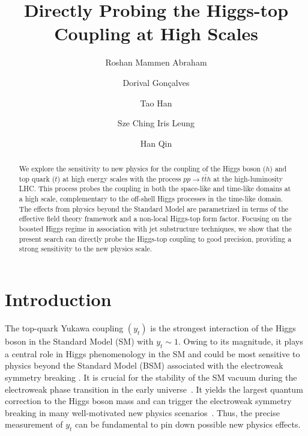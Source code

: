 \documentclass[reprint, aps,prd, preprintnumbers,groupedaddress,nofootinbib]{revtex4-1}
\begin{document}
\title{Directly Probing the Higgs-top Coupling at High Scales}

\author{Roshan Mammen Abraham}
\author{Dorival Gon\c{c}alves}
\author{Tao Han} 
\author{Sze Ching Iris Leung} 
\author{Han Qin} 



\begin{abstract}

We explore the sensitivity to new  physics for the coupling of the Higgs boson ($h$) and top quark ($t$) at high energy scales with the process $pp\to t\bar{t}h$ at the high-luminosity LHC. This process probes the coupling in both the space-like and time-like domains at a high scale, complementary to the off-shell Higgs processes in the time-like domain. The effects from  physics beyond the Standard Model are parametrized in terms of the effective field theory framework and a non-local Higgs-top form factor. Focusing on the boosted Higgs regime in association with jet substructure techniques, we show that the present search can directly probe the Higgs-top coupling to good  precision, providing a strong sensitivity to the new physics scale. 

\end{abstract}
\maketitle

\section{Introduction}
\label{sec:intro}

The top-quark Yukawa coupling $(y_t)$ is the strongest interaction of the Higgs boson in the Standard Model (SM) with $y_t \sim 1$. Owing to its magnitude, it plays a central role in Higgs phenomenology in the SM and could be most sensitive to physics beyond the Standard Model (BSM) associated with the electroweak symmetry breaking \cite{Hill:2002ap}. It is crucial for the stability of the SM vacuum during the electroweak phase transition in the early universe~\cite{Buttazzo:2013uya,Bezrukov:2014ina}. It yields the largest quantum correction to the Higgs boson mass and can trigger the electroweak symmetry breaking in many well-motivated new physics scenarios~\cite{Carena:1993bs,Panico:2011pw,Matsedonskyi:2012ym,Pomarol:2012qf,Bellazzini:2014yua,Panico:2015jxa}. Thus, the precise  measurement of $y_t$ can be fundamental to pin down possible new physics effects.
\end{document}
